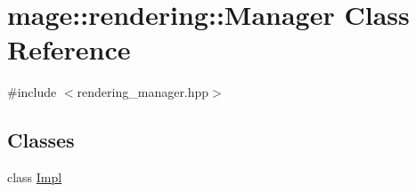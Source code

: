\hypertarget{classmage_1_1rendering_1_1_manager}{}\section{mage\+:\+:rendering\+:\+:Manager Class Reference}
\label{classmage_1_1rendering_1_1_manager}


{\ttfamily \#include $<$rendering\+\_\+manager.\+hpp$>$}

\subsection*{Classes}
\begin{DoxyCompactItemize}
\item 
class \hyperlink{classmage_1_1rendering_1_1_manager_1_1_impl}{Impl}
\end{DoxyCompactItemize}
